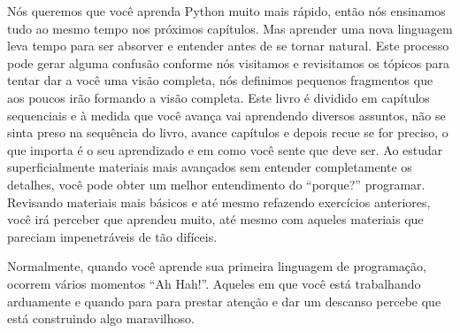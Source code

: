 Nós queremos que você aprenda Python muito mais rápido, então nós ensinamos tudo ao
mesmo tempo nos próximos capítulos.
Mas aprender uma nova linguagem leva tempo para ser absorver e entender antes de
se tornar natural.
Este processo pode gerar alguma confusão conforme nós visitamos e revisitamos os 
tópicos para tentar dar a você uma visão completa, nós definimos pequenos
fragmentos que aos poucos irão formando a visão completa. Este livro é dividido
em capítulos sequenciais e à medida que você avança vai aprendendo diversos assuntos,
não se sinta preso na sequência do livro, avance capítulos e depois recue se for
preciso, o que importa é o seu aprendizado e em como você sente que deve ser.
Ao estudar superficialmente materiais mais avançados sem entender completamente
os detalhes, você pode obter um melhor entendimento do ``porque?'' programar.
Revisando materiais mais básicos e até mesmo refazendo exercícios anteriores,
você irá perceber que aprendeu muito, até mesmo com aqueles materiais que pareciam
impenetráveis de tão difíceis.
%

Normalmente, quando você aprende sua primeira linguagem de programação, ocorrem
vários momentos ``Ah Hah!''. Aqueles em que você está trabalhando arduamente
e quando para para prestar atenção e dar um descanso percebe que está construindo
algo maravilhoso.
%

